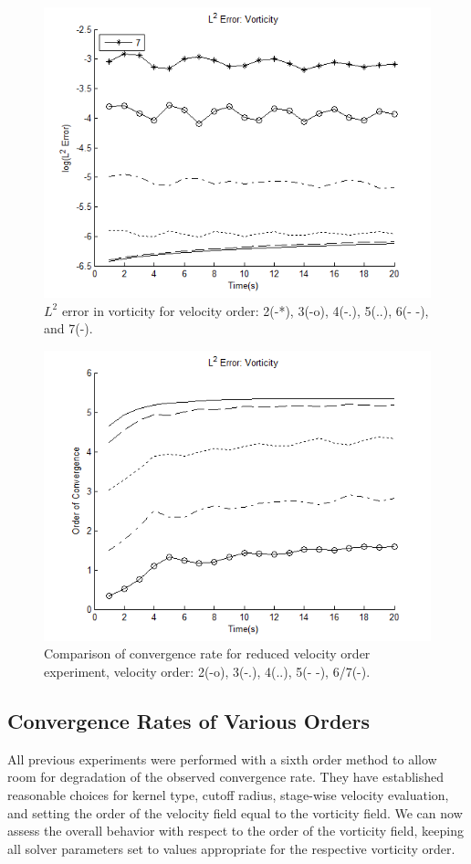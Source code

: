 \documentclass[letterpaper,12pt]{report}
\begin{document}
\begin{figure}
\centering
\includegraphics[width=1\textwidth]{VariableUWL2.PNG}
\caption{\label{fig:VariableUWL2}$L^2$ error in vorticity for velocity order: 2(-*), 3(-o), 4(-.), 5(..), 6(- -), and 7(-).}
\end{figure}
\begin{figure}
\centering
\includegraphics[width=1\textwidth]{VariableUWConvergence.PNG}
\caption{\label{fig:VariableUWConvergence}Comparison of convergence rate for reduced velocity order experiment, velocity order: 2(-o), 3(-.), 4(..), 5(- -), 6/7(-).}
\end{figure}

%
\subsection{Convergence Rates of Various Orders}
All previous experiments were performed with a sixth order method to allow room for degradation of the observed convergence rate. They have established reasonable choices for kernel type, cutoff radius, stage-wise velocity evaluation, and setting the order of the velocity field equal to the vorticity field. We can now assess the overall behavior with respect to the order of the vorticity field, keeping all solver parameters set to values appropriate for the respective vorticity order.
\end{document}
